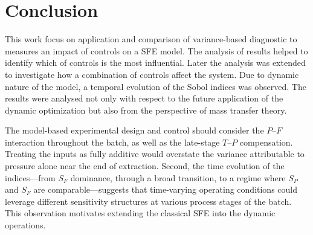 \documentclass[a4paper,fleqn]{cas-dc}
\begin{document}
		
		\section{Conclusion} \label{CH: Conclusion}
		This work focus on application and comparison of variance-based diagnostic to measures an impact of controls on a SFE model. The analysis of results helped to identify which of controls is the most influential. Later the analysis was extended to investigate how a combination of controls affect the system. Due to dynamic nature of the model, a temporal evolution of the Sobol indices was observed. The results were analysed not only with respect to the future application of the dynamic optimization but also from the perspective of mass transfer theory.
		
		The model-based experimental design and control should consider the $P$–$F$ interaction throughout the batch, as well as the late-stage $T$–$P$ compensation. Treating the inputs as fully additive would overstate the variance attributable to pressure alone near the end of extraction. Second, the time evolution of the indices—from $S_F$ dominance, through a broad transition, to a regime where $S_P$ and $S_F$ are comparable—suggests that time-varying operating conditions could leverage different sensitivity structures at various process stages of the batch. This observation motivates extending the classical SFE into the dynamic operations.

%



%

\end{document}
